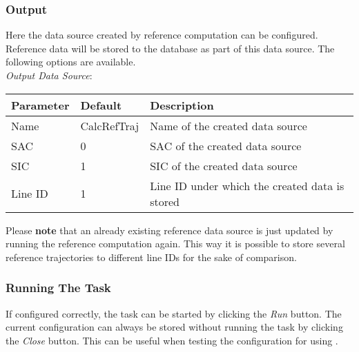 \subsubsection{Output}


Here the data source created by reference computation can be configured. 
Reference data will be stored to the database as part of this data source.
The following options are available. \\

\textit{Output Data Source}:
\begin{table}[H]
    \center
    \begin{tabularx}{\textwidth}{ | l | l | X |}
        \hline
        \textbf{Parameter} & \textbf{Default} & \textbf{Description} \\ \hline
        Name & CalcRefTraj & Name of the created data source \\ \hline
        SAC & 0 & SAC of the created data source \\ \hline
        SIC & 1 & SIC of the created data source \\ \hline
        Line ID & 1 & Line ID under which the created data is stored \\ \hline
    \end{tabularx}
\end{table}

Please \textbf{note} that an already existing reference data source is just updated by running the 
reference computation again. This way it is possible to store several reference trajectories to 
different line IDs for the sake of comparison.

\subsubsection{Running The Task}

If configured correctly, the task can be started by clicking the \textit{Run} button.
The current configuration can always be stored without running the task by clicking the \textit{Close} button. 
This can be useful when testing the configuration for using . \\

